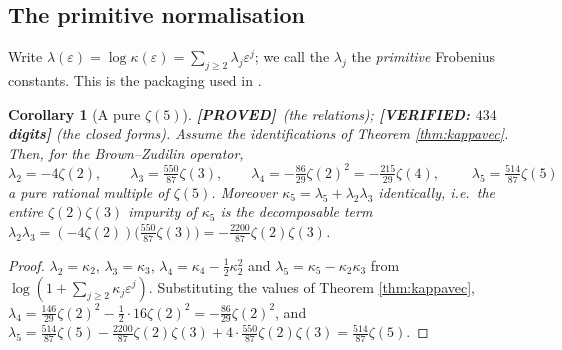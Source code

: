 \documentclass[11pt,reqno]{amsart}
\theoremstyle{plain}
\newtheorem{corollary}[theorem]{Corollary}
\theoremstyle{definition}
\theoremstyle{remark}
\newcommand{\PROVED}{{\normalfont\sffamily\bfseries[PROVED]}}
\newcommand{\VER}[1]{{\normalfont\sffamily\bfseries[VERIFIED: #1]}}
\newcommand{\eps}{\varepsilon}
\begin{document}
\subsection{The primitive normalisation}
Write $\lambda(\eps)=\log\kappa(\eps)=\sum_{j\ge2}\lambda_j\eps^{j}$; we call the $\lambda_j$ the
\emph{primitive} Frobenius constants. This is the packaging used in \cite[\S9]{GZ1}.

\begin{corollary}[A pure $\zeta(5)$]\label{cor:pure}
\PROVED\ (the relations); \VER{$434$ digits} (the closed forms).
\emph{Assume the identifications of Theorem \textup{\ref{thm:kappavec}}.} Then,
for the Brown--Zudilin operator,
\[
  \lambda_2=-4\zeta(2),\qquad \lambda_3=\tfrac{550}{87}\zeta(3),\qquad
  \lambda_4=-\tfrac{86}{29}\zeta(2)^2=-\tfrac{215}{29}\zeta(4),\qquad
  \boxed{\;\lambda_5=\tfrac{514}{87}\zeta(5)\;}
\]
a pure rational multiple of $\zeta(5)$. Moreover $\kappa_5=\lambda_5+\lambda_2\lambda_3$
identically, i.e.\ the entire $\zeta(2)\zeta(3)$ impurity of $\kappa_5$ is the
\emph{decomposable} term
$\lambda_2\lambda_3=(-4\zeta(2))\bigl(\tfrac{550}{87}\zeta(3)\bigr)
=-\tfrac{2200}{87}\zeta(2)\zeta(3)$.
\end{corollary}

\begin{proof}
$\lambda_2=\kappa_2$, $\lambda_3=\kappa_3$, $\lambda_4=\kappa_4-\tfrac12\kappa_2^2$ and
$\lambda_5=\kappa_5-\kappa_2\kappa_3$ from $\log(1+\sum_{j\ge2}\kappa_j\eps^j)$. Substituting
the values of Theorem \ref{thm:kappavec}, $\lambda_4=\tfrac{146}{29}\zeta(2)^2-\tfrac12\cdot
16\zeta(2)^2=-\tfrac{86}{29}\zeta(2)^2$, and
$\lambda_5=\tfrac{514}{87}\zeta(5)-\tfrac{2200}{87}\zeta(2)\zeta(3)
+4\cdot\tfrac{550}{87}\zeta(2)\zeta(3)=\tfrac{514}{87}\zeta(5)$.
\end{proof}
\end{document}
